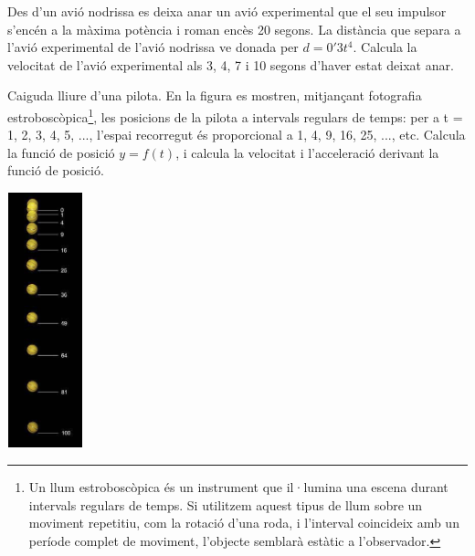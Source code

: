 \begin{minipage}{0.8\textwidth}
	\begin{mylist}
		
		\exer  Des d'un avió nodrissa es deixa anar un avió experimental que el seu impulsor s'encén a la màxima potència i roman encès 20 segons. La distància que separa a l'avió experimental de l'avió nodrissa ve donada per 
		$d = 0'3 t^4$. Calcula la velocitat de l'avió experimental als 3, 4, 7 i 10 segons d'haver estat deixat anar.
		
		
		\exer  Caiguda lliure d'una pilota. En la figura es mostren, mitjançant fotografia estroboscòpica\footnote{ Un llum estroboscòpica és un instrument que il·lumina una escena durant intervals regulars de temps. 
			Si utilitzem aquest tipus de llum sobre un moviment repetitiu, com la rotació d'una roda, i l'interval coincideix amb un període complet de moviment, l'objecte semblarà estàtic a l'observador.}, 
		les posicions de la pilota a intervals regulars de temps: per a  t = 1, 2, 3, 4, 5, ..., l'espai recorregut és proporcional a 1, 4, 9, 16, 25, ..., etc. 
		Calcula la funció de posició  $y=f(t)$, i calcula la velocitat i l'acceleració derivant la funció de posició.
		
		
		
	\end{mylist}
\end{minipage}
\begin{minipage}{0.2\textwidth}
	\begin{center}
		\includegraphics*[width=0.86in, height=2.91in, keepaspectratio=false]{img-07/image58}
	\end{center}
\end{minipage}
 
